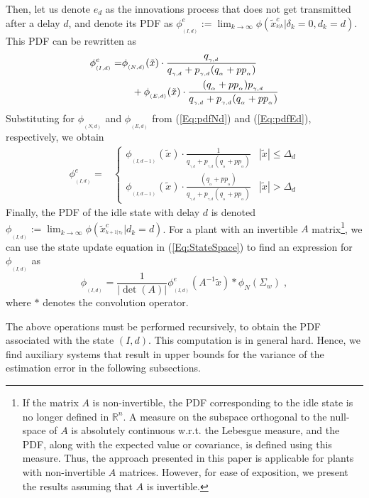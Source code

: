 \documentclass[twocolumn]{autart}
\begin{document}
Then, let us denote $e_d$ as the innovations process that does not get transmitted after a delay $d$, and denote its PDF as $\phi^e_{_{(I,d)}}:= \lim_{k \to \infty} \phi(\tilde{x}^c_{^{k|k}} | \delta_k=0, d_k=d)$. This PDF can be rewritten as
\begin{align}
\phi^e_{_{(I,d)}} = &\phi_{_{(N,d)}}(\tilde{x}) \cdot \frac{q_{_{\gamma,d}}}{q_{_{\gamma,d}}+p_{_{\gamma,d}}(q_{_{\alpha}} + p p_{_{\alpha}})} \\
&\quad + \phi_{_{(E,d)}}(\tilde{x}) \cdot \frac{(q_{_{\alpha}} + p p_{_{\alpha}}) p_{_{\gamma,d}}}{q_{_{\gamma,d}}+p_{_{\gamma,d}}(q_{_{\alpha}} + p p_{_{\alpha}})} \notag
\end{align}
Substituting for $\phi_{_{(N,d)}}$ and $\phi_{_{(E,d)}}$ from (\ref{Eq:pdfNd}) and (\ref{Eq:pdfEd}), respectively, we obtain
\begin{align}
\phi^e_{_{(I,d)}} = &\begin{cases}
\phi_{_{(I,d-1)}}(\tilde{x}) \cdot \frac{1}{q_{_{\gamma,d}}+p_{_{\gamma,d}}(q_{_{\alpha}} + p p_{_{\alpha}})} & |\tilde{x}| \le \Delta_d \\
\phi_{_{(I,d-1)}}(\tilde{x}) \cdot \frac{(q_{_{\alpha}} + p p_{_{\alpha}})}{q_{_{\gamma,d}}+p_{_{\gamma,d}}(q_{_{\alpha}} + p p_{_{\alpha}})} & |\tilde{x}| > \Delta_d
\end{cases} \label{Eq:phied}
\end{align}
Finally, the PDF of the idle state with delay $d$ is denoted $\phi_{_{(I,d)}} := \lim_{k \to \infty} \phi(\tilde{x}^c_{^{k+1|\tau_k}}| d_k = d)$. For a plant with an invertible $A$ matrix\footnote{If the matrix $A$ is non-invertible, the PDF corresponding to the idle state is no longer defined in $\mathbb{R}^n$. A measure on the subspace orthogonal to the null-space of $A$ is absolutely continuous w.r.t. the Lebesgue measure, and the PDF, along with the expected value or covariance, is defined using this measure. Thus, the approach presented in this paper is applicable for plants with non-invertible $A$ matrices. However, for ease of exposition, we present the results assuming that $A$ is invertible.}, we can use the state update equation in (\ref{Eq:StateSpace}) to find an expression for $\phi_{_{(I,d)}}$ as
\begin{equation} \label{Eq:UpdatePDF}
\phi_{_{(I,d)}} = \frac{1}{|\det(A)|} \phi^e_{_{(I,d)}}(A^{-1} \tilde{x}) \ast \phi_N(\Sigma_w) \; ,
\end{equation}
where $\ast$ denotes the convolution operator. 

The above operations must be performed recursively, to obtain the PDF associated with the state $(I,d)$. This computation is in general hard. Hence, we find auxiliary systems that result in upper bounds for the variance of the estimation error in the following subsections.
\end{document}
